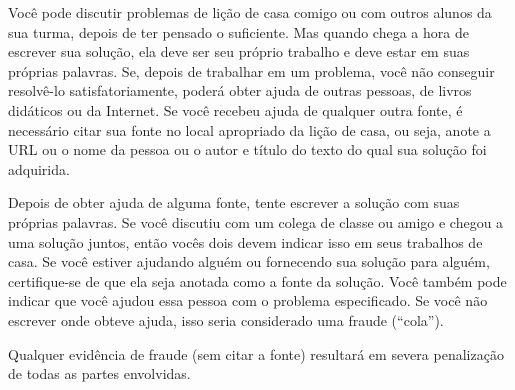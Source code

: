 \documentclass[a4paper,12pt]{scrartcl}
\begin{document}
Você pode discutir problemas de lição de casa comigo ou com outros alunos da sua
turma, depois de ter pensado o suficiente. Mas quando chega a hora de escrever
sua solução, ela deve ser seu próprio trabalho e deve estar em suas próprias
palavras. Se, depois de trabalhar em um problema, você não conseguir resolvê-lo
satisfatoriamente, poderá obter ajuda de outras pessoas, de livros didáticos ou
da Internet. Se você recebeu ajuda de qualquer outra fonte, é necessário citar
sua fonte no local apropriado da lição de casa, ou seja, anote a URL ou o nome
da pessoa ou o autor e título do texto do qual sua solução foi adquirida.

Depois de obter ajuda de alguma fonte, tente escrever a solução com suas
próprias palavras. Se você discutiu com um colega de classe ou amigo e chegou a
uma solução juntos, então vocês dois devem indicar isso em seus trabalhos de
casa. Se você estiver ajudando alguém ou fornecendo sua solução para alguém,
certifique-se de que ela seja anotada como a fonte da solução. Você também pode
indicar que você ajudou essa pessoa com o problema especificado. Se você não
escrever onde obteve ajuda, isso seria considerado uma fraude (``cola'').

Qualquer evidência de fraude (sem citar a fonte) resultará em severa
penalização de todas as partes envolvidas.
\end{document}
